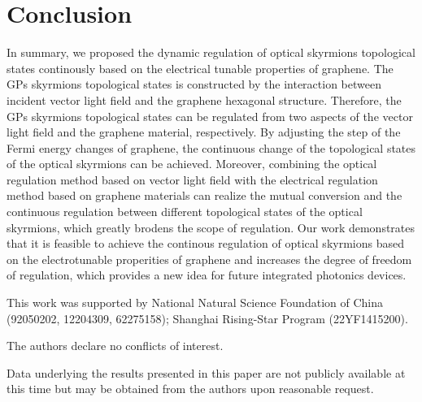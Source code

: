 \documentclass{optica-article}
\begin{document}
\section{Conclusion}
In summary, we proposed the dynamic regulation of optical skyrmions topological states continously based on the electrical tunable properties of graphene. The GPs skyrmions topological states is constructed by the interaction between incident vector light field and the graphene hexagonal structure. Therefore, the GPs skyrmions topological states can be regulated from two aspects of the vector light field and the graphene material, respectively. By adjusting the step of the Fermi energy changes of graphene, the continuous change of the topological states of the optical skyrmions can be achieved. Moreover, combining the optical regulation method based on vector light field with the electrical regulation method based on graphene materials can realize the mutual conversion and the continuous regulation between different topological states of the optical skyrmions, which greatly brodens the scope of regulation. Our work demonstrates that it is feasible to achieve the continous regulation of optical skyrmions based on the electrotunable properities of graphene and increases the degree of freedom of regulation, which provides a new idea for future integrated photonics devices.


\begin{backmatter}
 This work was supported by National Natural Science Foundation of China (92050202, 12204309, 62275158); Shanghai Rising-Star  Program (22YF1415200).

The authors declare no conflicts of interest.

Data underlying the results presented in this paper are not publicly available at this time but may be obtained from the authors upon reasonable request.

\end{backmatter}







\end{document}
